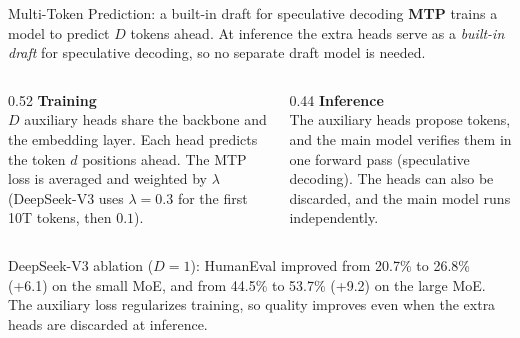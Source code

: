 \documentclass[aspectratio=169,10pt]{beamer}
\begin{document}
\begin{frame}{Multi-Token Prediction: a built-in draft for speculative decoding}
  \textbf{MTP} trains a model to predict $D$ tokens ahead. At inference
  the extra heads serve as a \emph{built-in draft} for speculative decoding,
  so no separate draft model is needed.
  \vspace{0.6em}
  \begin{columns}[T]
    \begin{column}{0.52\textwidth}
      \textbf{Training}\\[0.3em]
      \small
      $D$ auxiliary heads share the backbone and the embedding layer. Each head
      predicts the token $d$ positions ahead. The MTP loss is averaged and
      weighted by $\lambda$ (DeepSeek-V3 uses $\lambda{=}0.3$ for the first 10T
      tokens, then $0.1$).
    \end{column}
    \begin{column}{0.44\textwidth}
      \textbf{Inference}\\[0.3em]
      \small
      The auxiliary heads propose tokens, and the main model verifies them in
      one forward pass (speculative decoding). The heads can also be
      discarded, and the main model runs independently.
    \end{column}
  \end{columns}
  \vspace{0.8em}
  \begin{center}\small
    DeepSeek-V3 ablation ($D{=}1$): HumanEval improved from 20.7\% to 26.8\%
    (+6.1) on the small MoE, and from 44.5\% to 53.7\% (+9.2) on the large
    MoE. The auxiliary loss regularizes training, so quality improves even
    when the extra heads are discarded at inference.
  \end{center}
\end{frame}
\end{document}
